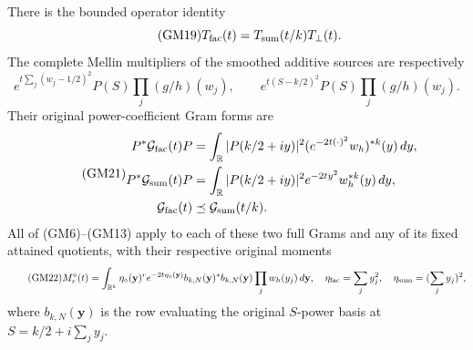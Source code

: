 \begin{hzoctheorem}
There is the bounded operator identity
\begin{equation}\tag{GM19}
 T_{\rm fac}(t)=T_{\rm sum}(t/k)T_{\perp}(t).
\end{equation}
The complete Mellin multipliers of the smoothed additive sources are
respectively
\begin{equation}\tag{GM20}
 e^{t\sum_j(w_j-1/2)^2}P(S)\prod_j(g/h)(w_j),\qquad
 e^{t(S-k/2)^2}P(S)\prod_j(g/h)(w_j).
\end{equation}
Their original power-coefficient Gram forms are
\begin{equation}\tag{GM21}
 \begin{split}
 P^*\mathcal G_{\rm fac}(t)P
 &=\int_{\mathbb R}|P(k/2+iy)|^2
               (e^{-2t(\cdot)^2}w_h)^{*k}(y)\,dy,\\
 P^*\mathcal G_{\rm sum}(t)P
 &=\int_{\mathbb R}|P(k/2+iy)|^2
                 e^{-2ty^2}w_h^{*k}(y)\,dy,\\
 \mathcal G_{\rm fac}(t)&\preceq\mathcal G_{\rm sum}(t/k).
 \end{split}
\end{equation}
All of (GM6)--(GM13) apply to each of these two full Grams and any
of its fixed attained quotients, with their respective original
moments
\begin{equation}\tag{GM22}
 M_r^\diamond(t)=\int_{\mathbb R^k}
   \eta_\diamond(\mathbf y)^r e^{-2t\eta_\diamond(\mathbf y)}
   b_{k,N}(\mathbf y)^*b_{k,N}(\mathbf y)
                          \prod_jw_h(y_j)\,d\mathbf y,
 \quad
 \eta_{\rm fac}=\sum_jy_j^2,\quad
 \eta_{\rm sum}=(\sum_jy_j)^2,
\end{equation}
where $b_{k,N}(\mathbf y)$ is the row evaluating the original
$S$-power basis at $S=k/2+i\sum_jy_j$.
\end{hzoctheorem}
